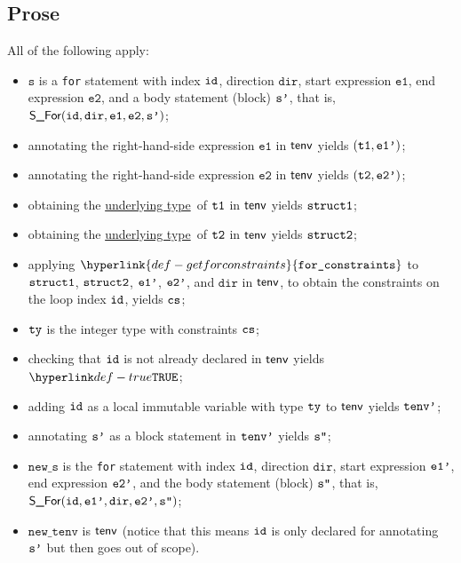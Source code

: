 \documentclass{book}
\newcommand\ProseOrTypeError[0]{\ProseTerminateAs{\TypeErrorConfig}}
\newcommand\getforconstraints[0]{\hyperlink{def-getforconstraints}{\texttt{for\_constraints}}}
\newcommand\underlyingtype[0]{\hyperlink{def-underlyingtype}{underlying type}}
\newcommand\newtenv[0]{\texttt{new\_tenv}}
\newcommand\veone[0]{\texttt{e1}}
\newcommand\vetwo[0]{\texttt{e2}}
\newcommand\vs[0]{\texttt{s}}
\newcommand\news[0]{\texttt{new\_s}}
\newcommand\dir[0]{\texttt{dir}}
\begin{document}
\subsection{Prose}
All of the following apply:
\begin{itemize}
  \item $\vs$ is a \texttt{for} statement with index $\texttt{id}$, direction $\dir$, start expression
        $\veone$, end expression $\vetwo$, and a body statement (block) $\texttt{s'}$, that is, $\SFor(\id, \dir, \veone, \vetwo, \vsp)$;
  \item annotating the right-hand-side expression $\veone$ in $\textsf{tenv}$ yields $(\texttt{t1}, \texttt{e1'})$\ProseOrTypeError;
  \item annotating the right-hand-side expression $\vetwo$ in $\textsf{tenv}$ yields $(\texttt{t2}, \texttt{e2'})$\ProseOrTypeError;
  \item obtaining the \underlyingtype\ of $\texttt{t1}$ in $\textsf{tenv}$ yields $\texttt{struct1}$\ProseOrTypeError;
  \item obtaining the \underlyingtype\ of $\texttt{t2}$ in $\textsf{tenv}$ yields $\texttt{struct2}$\ProseOrTypeError;
  \item applying $\getforconstraints$ to $\texttt{struct1}$, $\texttt{struct2}$,
        $\texttt{e1'}$, $\texttt{e2'}$, and $\dir$ in $\textsf{tenv}$,
        to obtain the constraints on the loop index $\texttt{id}$,
        yields $\texttt{cs}$\ProseOrTypeError;
  \item $\texttt{ty}$ is the integer type with constraints $\texttt{cs}$;
  \item checking that $\texttt{id}$ is not already declared in $\textsf{tenv}$ yields $\True$\ProseOrTypeError;
  \item adding $\texttt{id}$ as a local immutable variable with type $\texttt{ty}$ to $\textsf{tenv}$ yields $\texttt{tenv'}$;
  \item annotating $\texttt{s'}$ as a block statement in $\texttt{tenv'}$ yields $\texttt{s''}$\ProseOrTypeError;
  \item $\news$ is the \texttt{for} statement with index $\texttt{id}$, direction $\dir$, start expression $\texttt{e1'}$,
        end expression $\texttt{e2'}$, and the body statement (block) $\texttt{s''}$, that is, \\
        $\SFor(\id, \veonep, \dir, \vetwop, \vspp)$;
  \item $\newtenv$ is $\textsf{tenv}$ (notice that this means $\texttt{id}$ is only declared for annotating $\texttt{s'}$ but then goes
        out of scope).
\end{itemize}

\end{document}
